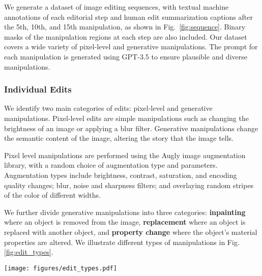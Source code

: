 \documentclass[10pt,twocolumn,letterpaper]{article}
\begin{document}
We generate a dataset of image editing sequences, with textual machine annotations of each editorial step and human edit 
summarization captions after the 5th, 10th, and 15th manipulation, as shown in Fig.~\ref{fig:sequence}. Binary masks of the manipulation regions at each step are also included.
Our dataset covers a wide variety of pixel-level and generative manipulations. The prompt for each manipulation is generated using GPT-3.5 to ensure plausible and diverse manipulations.

\subsubsection{Individual Edits}

We identify two main categories of edits: pixel-level and generative
manipulations. Pixel-level edits are simple manipulations such as changing the
brightness of an image or applying a blur filter. Generative manipulations change
the semantic content of the image, altering the story that the image tells.

Pixel level manipulations are performed using the Augly\cite{augly} image
augmentation library, with a random choice of augmentation type and parameters.
Augmentation types include brightness, contrast, saturation, and encoding
quality changes; blur, noise and sharpness filters; and overlaying random
stripes of the color of different widths. 

We further divide generative manipulations into three categories:
\textbf{inpainting} where an object is removed from the image,
\textbf{replacement} where an object is replaced with another object, and
\textbf{property change} where the object's material properties are altered. We
illustrate different types of manipulations in Fig. \ref{fig:edit_types}.

\begin{figure*}[ht]
    \centering
    \texttt{[image: figures/edit\_types.pdf]}
    \caption{Illustration of the different types of manipulations performed using Firefly Generative Fill.
    \textbf{(left)} Inpainting is done by using the word \textit{background} as the prompt. 
    \textbf{(middle)} property change is done by prompting GPT3.5 to output a likely change in color, material, texture or other applicable property of the object.
    \textbf{(right)} replacement is done by prompting GPT3.5 to output a likely replacement candidate object that would be a close match to the shape of the original, but different semantically.
}
    \label{fig:edit_types}
\end{figure*}
\end{document}
